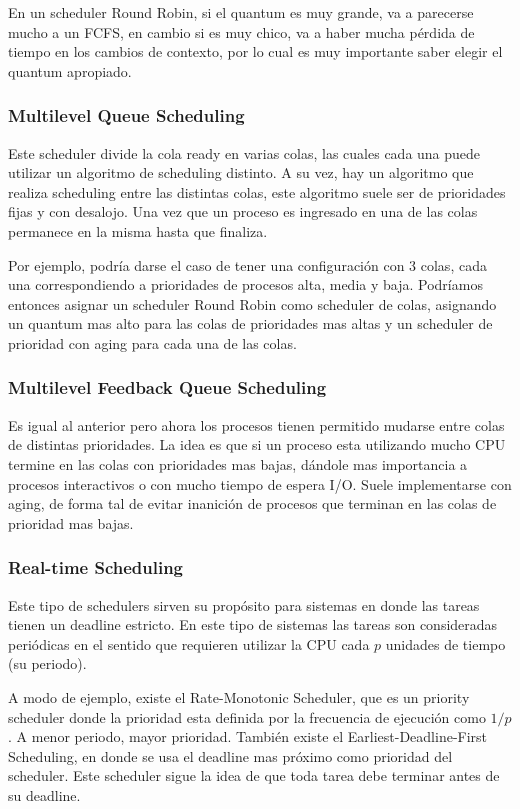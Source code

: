 \documentclass{article}
\begin{document}
En un scheduler Round Robin, si el quantum es muy grande, va a parecerse mucho a un FCFS, en cambio si es muy chico, va a haber mucha p\'erdida de tiempo en los cambios de contexto, por lo cual es muy importante saber elegir el quantum apropiado.

\subsubsection{Multilevel Queue Scheduling}
Este scheduler divide la cola ready en varias colas, las cuales cada una puede utilizar un algoritmo de scheduling distinto. A su vez, hay un algoritmo que realiza scheduling entre las distintas colas, este algoritmo suele ser de prioridades fijas y con desalojo. Una vez que un proceso es ingresado en una de las colas permanece en la misma hasta que finaliza. 

Por ejemplo, podría darse el caso de tener una configuración con 3 colas, cada una correspondiendo a prioridades de procesos alta, media y baja. Podríamos entonces asignar un scheduler Round Robin como scheduler de colas, asignando un quantum mas alto para las colas de prioridades mas altas y un scheduler de prioridad con aging para cada una de las colas.

\subsubsection{Multilevel Feedback Queue Scheduling}
Es igual al anterior pero ahora los procesos tienen permitido mudarse entre colas de distintas prioridades. La idea es que si un proceso esta utilizando mucho CPU termine en las colas con prioridades mas bajas, dándole mas importancia a procesos interactivos o con mucho tiempo de espera I/O. Suele implementarse con aging, de forma tal de evitar inanición de procesos que terminan en las colas de prioridad mas bajas.

\subsubsection{Real-time Scheduling}
Este tipo de schedulers sirven su propósito para sistemas en donde las tareas tienen un deadline estricto. En este tipo de sistemas las tareas son consideradas periódicas en el sentido que requieren utilizar la CPU cada $p$ unidades de tiempo (su periodo).

A modo de ejemplo, existe el Rate-Monotonic Scheduler, que es un priority scheduler donde la prioridad esta definida por la frecuencia de ejecución como $1/p$. A menor periodo, mayor prioridad. También existe el Earliest-Deadline-First Scheduling, en donde se usa el deadline mas próximo como prioridad del scheduler. Este scheduler sigue la idea de que toda tarea debe terminar antes de su deadline.
\end{document}
